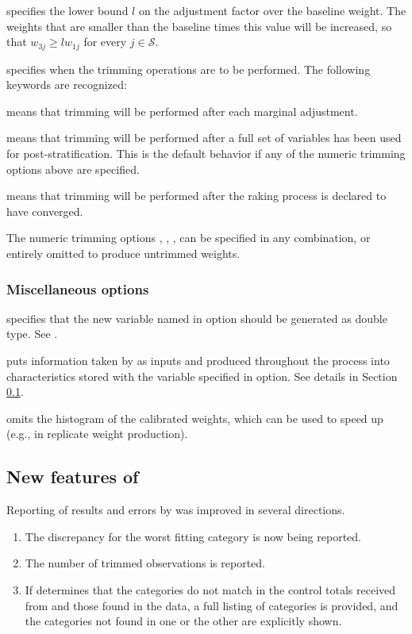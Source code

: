 \hangpara
{} specifies the lower bound $l$ on the adjustment factor
    over the baseline weight.  The weights that are smaller than the baseline
    times this value will be increased, so that
    $w_{3j} \ge l w_{1j}$ for every $j\in\mathcal{S}$.

\hangpara
{} specifies when the trimming operations
    are to be performed. The following keywords are recognized:

\morehang {} means that trimming will be performed
    after each marginal adjustment.

\morehang {} means that trimming will be performed
    after a full set of variables has been used for post-stratification.
    This is the default behavior if any of the numeric trimming
    options above are specified.

\morehang {}
    means that trimming will be performed after the raking process
    is declared to have converged.

The numeric trimming options , ,
,  can be specified in any combination,
or entirely omitted to produce untrimmed weights. 

\subsubsection{Miscellaneous options}

\hangpara
{} specifies that the new variable named in 
option should be generated as double type. See .

\hangpara
{} puts information taken by  as inputs and produced
    throughout the process into characteristics stored with the variable specified in
     option. See details in Section \ref{subsec:example:meta}.

\hangpara
{} omits the histogram of the calibrated weights, which can be
used to speed up  (e.g., in replicate weight production).

\subsection{New features of }
\label{subsec:example:meta}

Reporting of results and errors by  was improved in several directions.
\begin{enumerate}
    \item The discrepancy for the worst fitting category is now being reported.
    \item The number of trimmed observations is reported.
    \item If  determines that the categories do not match
        in the control totals received from  and those found in
        the data, a full listing of categories is provided, and the categories
        not found in one or the other are explicitly shown.
\end{enumerate}


